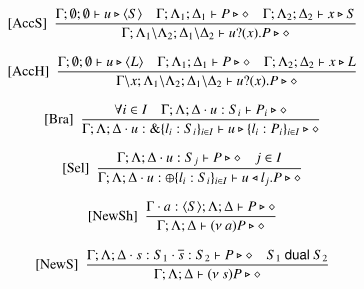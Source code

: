 \begin{figure}[t]
\[\begin{array}{c}
		\trule{AccS}~~\tree{
			\Gamma; \emptyset; \emptyset \proves u \hastype \chtype{S}
			\quad
			\Gamma; \Lambda_1; \Delta_1 \proves P \hastype \Proc
			\quad
			\Gamma; \Lambda_2; \Delta_2 \proves x \hastype S
		}{
			\Gamma; \Lambda_1 \backslash \Lambda_2; \Delta_1 \backslash \Delta_2 \proves \binp{u}{x} P \hastype \Proc
		}
		\\[6mm]

		\trule{AccH}~~\tree{
			\Gamma; \emptyset; \emptyset \proves u \hastype \chtype{L}
			\quad
			\Gamma; \Lambda_1; \Delta_1 \proves P \hastype \Proc
			\quad
			\Gamma; \Lambda_2; \Delta_2 \proves x \hastype L
		}{
			\Gamma \backslash x; \Lambda_1 \backslash \Lambda_2; \Delta_1 \backslash \Delta_2 \proves \binp{u}{x} P \hastype \Proc
		}
		\\[6mm]

		\trule{Bra}~~\tree{
			 \forall i \in I \quad \Gamma; \Lambda; \Delta \cat u:S_i \proves P_i \hastype \Proc
		}{
			\Gamma; \Lambda; \Delta \cat u: \btbra{l_i:S_i}_{i \in I} \proves \bbra{u}{l_i:P_i}_{i \in I}\hastype \Proc
		}
\\[6mm]
	 	\trule{Sel}~~\tree{
			\Gamma; \Lambda; \Delta \cat u: S_j  \proves P \hastype \Proc \quad j \in I
		}{
			\Gamma; \Lambda; \Delta \cat u:\btsel{l_i:S_i}_{i \in I} \proves \bsel{u}{l_j} P \hastype \Proc
		}
		\\[6mm]

%

		\trule{NewSh}~~\tree{
			\Gamma\cat a:\chtype{S} ; \Lambda; \Delta \proves P \hastype \Proc
		}{
			\Gamma; \Lambda; \Delta \proves \news{a} P \hastype \Proc}
\\[6mm]
		\trule{NewS}~~\tree{
			\Gamma; \Lambda; \Delta \cat s:S_1 \cat \dual{s}: S_2 \proves P \hastype \Proc \quad S_1 \dualof S_2
		}{
			\Gamma; \Lambda; \Delta \proves \news{s} P \hastype \Proc
		}
		\\[6mm]


\end{array}\]
\end{figure}
